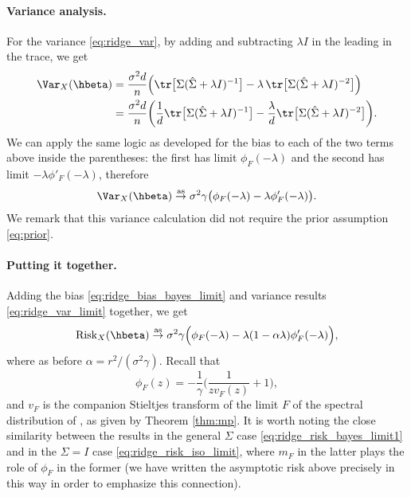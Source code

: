 \documentclass{article}
\begin{document}
\paragraph{Variance analysis.}

For the variance \eqref{eq:ridge_var}, by adding and subtracting $\lambda I$ in
the leading \smash{$\hSigma$} in the trace, we get 
\begin{align*}
\Var_X(\hbeta) 
&= \frac{\sigma^2 d}{n} \Big( \tr \big[ \Sigma ( \hSigma + \lambda I)^{-1} \big] -
  \lambda \, \tr \big[ \Sigma (\hSigma + \lambda I)^{-2} \big] \Big) \\
&= \frac{\sigma^2 d}{n} \bigg( \frac{1}{d} \tr \big[ \Sigma ( \hSigma + \lambda 
  I)^{-1} \big] -\frac{\lambda}{d} \tr \big[ \Sigma (\hSigma + \lambda I)^{-2} 
  \big] \bigg).
\end{align*}
We can apply the same logic as developed for the bias to each of the two terms
above inside the parentheses: the first has limit $\phi_F(-\lambda)$ and the
second has limit $-\lambda \phi'_F(-\lambda)$, therefore   
\begin{equation}
\label{eq:ridge_var_limit}
\Var_X(\hbeta) \asto \sigma^2 \gamma \big( \phi_F(-\lambda) - \lambda 
\phi'_F(-\lambda) \big).
\end{equation}
We remark that this variance calculation did not require the prior assumption
\eqref{eq:prior}.  

\paragraph{Putting it together.}

Adding the bias \eqref{eq:ridge_bias_bayes_limit} and variance results
\eqref{eq:ridge_var_limit} together, we get
\begin{equation}
\label{eq:ridge_risk_bayes_limit1}
\Risk_X(\hbeta) \asto \sigma^2 \gamma \Big( \phi_F(-\lambda) - \lambda (1 -
\alpha \lambda) \phi'_F(-\lambda) \Big),  
\end{equation}
where as before $\alpha = r^2 / (\sigma^2 \gamma)$. Recall that 
 \[
\phi_F(z) = -\frac{1}{\gamma} \bigg( \frac{1}{z v_F(z)} + 1 \bigg),
\]
and $v_F$ is the companion Stieltjes transform of the limit $F$ of the spectral
distribution of \smash{$\hSigma$}, as given by Theorem \ref{thm:mp}. It is worth
noting the close similarity between the results in the general $\Sigma$ case
\eqref{eq:ridge_risk_bayes_limit1} and in the $\Sigma = I$ case
\eqref{eq:ridge_risk_iso_limit}, where $m_F$ in the latter plays the role of 
$\phi_F$ in the former (we have written the asymptotic risk above precisely in
this way in order to emphasize this connection). 
\end{document}
